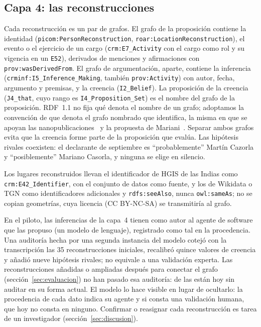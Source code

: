 \documentclass[runningheads]{llncs}
\newcommand{\ttt}[1]{\texttt{\small #1}}
\begin{document}
\subsection{Capa 4: las reconstrucciones}
Cada reconstrucción es un par de grafos. El grafo de la proposición contiene la identidad
(\ttt{picom:PersonReconstruction}, \ttt{roar:LocationReconstruction}), el evento o el ejercicio de un cargo
(\ttt{crm:E7\_Activity} con el cargo como rol y su vigencia en un \ttt{E52}), derivados de menciones y afirmaciones
con \ttt{prov:wasDerivedFrom}. El grafo de argumentación, aparte, contiene la inferencia
(\ttt{crminf:I5\_Inference\_Making}, también \ttt{prov:Activity}) con autor, fecha, argumento y premisas, y la creencia
(\ttt{I2\_Belief}). La proposición de la creencia (\ttt{J4\_that}, cuyo rango es \ttt{I4\_Proposition\_Set}) es el
nombre del grafo de la proposición. RDF~1.1 no fija qué denota el nombre de un grafo; adoptamos la convención de que
denota el grafo nombrado que identifica, la misma en que se apoyan las nanopublicaciones~\cite{kuhn2016nanopub} y
la propuesta de Mariani~\cite{mariani2023}. Separar ambos grafos evita que la creencia forme parte de la proposición
que evalúa. Las hipótesis rivales coexisten: el declarante de septiembre es \enquote{probablemente} Martín Cazorla y
\enquote{posiblemente} Mariano Casorla, y ninguna se elige en silencio.

Los lugares reconstruidos llevan el identificador de HGIS de las Indias como \ttt{crm:E42\_Identifier}, con el
conjunto de datos como fuente, y los de Wikidata o TGN como identificadores adicionales y \ttt{rdfs:seeAlso}, nunca
\ttt{owl:sameAs}; no se copian geometrías, cuya licencia (CC BY-NC-SA) se transmitiría al grafo.

En el piloto, las \cifraReconstruccionesConFechas{} inferencias de la capa~4 tienen como autor al agente de software que las propuso (un modelo de
lenguaje), registrado como tal en la procedencia. Una auditoría hecha por una segunda instancia del modelo cotejó
con la transcripción las 35 reconstrucciones iniciales, recalibró quince valores de creencia y añadió nueve hipótesis
rivales; no equivale a una validación experta. Las reconstrucciones añadidas o ampliadas después para conectar el
grafo (sección~\ref{sec:evaluacion}) no han pasado esa auditoría: \cifraReconstruccionesSinAuditar{} de las
\cifraReconstrucciones{} están hoy sin auditar en su forma actual. El modelo lo hace visible en lugar de ocultarlo: la procedencia de
cada dato indica su agente y si consta una validación humana, que hoy no consta en ninguno. Confirmar o reasignar cada
reconstrucción es tarea de un investigador (sección~\ref{sec:discusion}).
\end{document}
